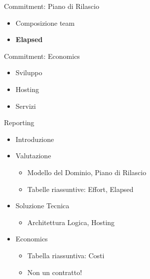 \documentclass[compress, red, 14pt]{beamer}
\begin{document}
	\begin{frame}{Commitment: Piano di Rilascio}
		\begin{itemize}
			\item Composizione team
		\end{itemize}

		\begin{itemize}
			\item \textbf{Elapsed}
		\end{itemize}
	\end{frame}
	
	\begin{frame}{Commitment: Economics}
		\begin{itemize}
			\item Sviluppo
			\item Hosting
			\item Servizi
		\end{itemize}

	\end{frame}
	
	\begin{frame}{Reporting}
		\begin{itemize}
			\item Introduzione
			\item Valutazione
			\begin{itemize}
				\item Modello del Dominio, Piano di Rilascio
				\item Tabelle riassuntive: Effort, Elapsed
			\end{itemize}
			\item Soluzione Tecnica
			\begin{itemize}
				\item Architettura Logica, Hosting
			\end{itemize}
			\item Economics
			\begin{itemize}
				\item Tabella riassuntiva: Costi
				\item Non un contratto!
			\end{itemize}
		\end{itemize}
	\end{frame}
	
\end{document}
